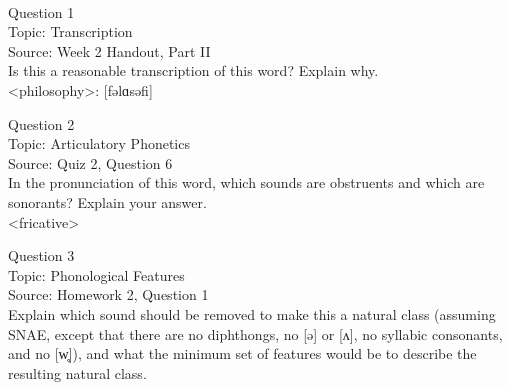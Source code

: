 \documentclass[12pt]{article}
\begin{document}
\newpage

\begin{center}
\textbf{{\color{red}{\HUGE END OF EXAM}}}\\

\end{center}
\newpage

\begin{center}
\textbf{{\color{blue}{\HUGE START OF EXAM\\}}}

\textbf{{\color{blue}{\HUGE Student ID: 39945\\}}}

\textbf{{\color{blue}{\HUGE \\}}}

\end{center}
\newpage

{\large Question 1}\\

Topic: Transcription\\
Source: Week 2 Handout, Part II\\

Is this a reasonable transcription of this word? Explain why.\\

<philosophy>: {[fəlɑsəfi]}


\newpage

{\large Question 2}\\

Topic: Articulatory Phonetics\\
Source: Quiz 2, Question 6\\

In the pronunciation of this word, which sounds are obstruents and which are sonorants? Explain your answer.\\

<fricative>


\newpage

{\large Question 3}\\

Topic: Phonological Features\\
Source: Homework 2, Question 1\\

Explain which sound should be removed to make this a natural class (assuming SNAE, except that there are no diphthongs, no [ə] or [ʌ], no syllabic consonants, and no [w̥]), and what the minimum set of features would be to describe the resulting natural class.\\
\end{document}

